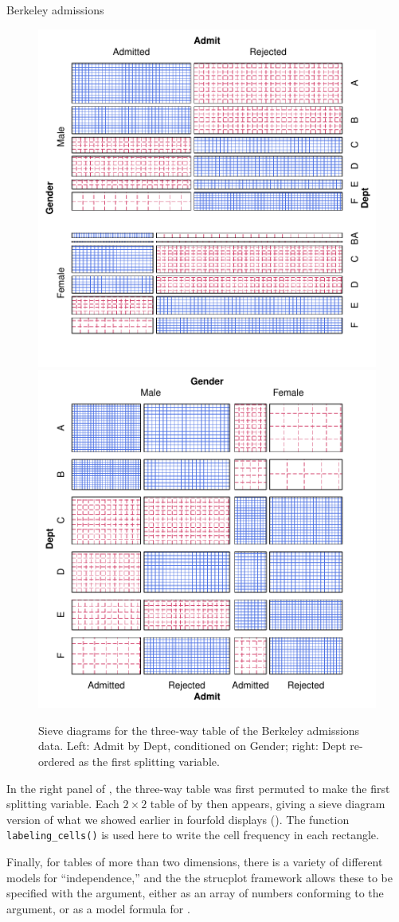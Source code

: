 \documentclass[11pt]{book}
\renewenvironment{knitrout}{\small\renewcommand{\baselinestretch}{.85}}{} %
\begin{document}
\begin{Example}[berkeley3]{Berkeley admissions}
\begin{knitrout}
\begin{figure}[!htbp]
\centerline{\includegraphics[width=.49\textwidth]{ch04/fig/berkeley-sieve1} 
\includegraphics[width=.49\textwidth]{ch04/fig/berkeley-sieve2} }

\caption[Sieve diagrams for the three-way table of the Berkeley admissions data]{Sieve diagrams for the three-way table of the Berkeley admissions data. Left: Admit by Dept, conditioned on Gender; right: Dept re-ordered as the first splitting variable.\label{fig:berkeley-sieve}}
\end{figure}


\end{knitrout}
In the right panel of , the three-way table
was first permuted to make  the first splitting variable.
Each $2 \times 2$ table of  by  then appears,
giving a sieve diagram version of what we showed earlier in 
fourfold displays (). 
The function \verb|labeling_cells()| is
used here to write the cell frequency in each rectangle.

Finally, for tables of more than two dimensions, there is a variety of
different models for ``independence,'' and the the strucplot framework 
allows these to be specified with the  argument,
either as an array of numbers conforming to the 
argument, or as a model formula for .


\end{Example}
\end{document}
